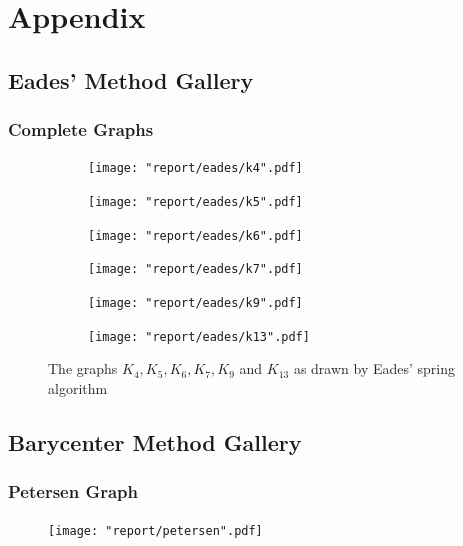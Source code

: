 \documentclass[11pt]{report}
\begin{document}
\chapter{Appendix}
\section{Eades' Method Gallery}
\subsection{Complete Graphs}
\begin{figure}[H]
    \centering
    
    \begin{subfigure}{.3\linewidth}
    \texttt{[image: "report/eades/k4".pdf]}
    \end{subfigure}
    \begin{subfigure}{.3\linewidth}
    \texttt{[image: "report/eades/k5".pdf]}
    \end{subfigure}
    \begin{subfigure}{.3\linewidth}
    \texttt{[image: "report/eades/k6".pdf]}
    \end{subfigure}

    \begin{subfigure}{.3\linewidth}
    \texttt{[image: "report/eades/k7".pdf]}
    \end{subfigure}
    \begin{subfigure}{.3\linewidth}
    \texttt{[image: "report/eades/k9".pdf]}
    \end{subfigure}
    \begin{subfigure}{.3\linewidth}
    \texttt{[image: "report/eades/k13".pdf]}
    \end{subfigure}

    \caption{The graphs $K_4, K_5, K_6, K_7, K_9$ and $K_{13}$ as drawn by Eades' spring algorithm}
\end{figure}

\section{Barycenter Method Gallery}
\subsection{Petersen Graph}
\begin{figure}[H]
    \centering
    \texttt{[image: "report/petersen".pdf]}
\end{figure}
\end{document}
